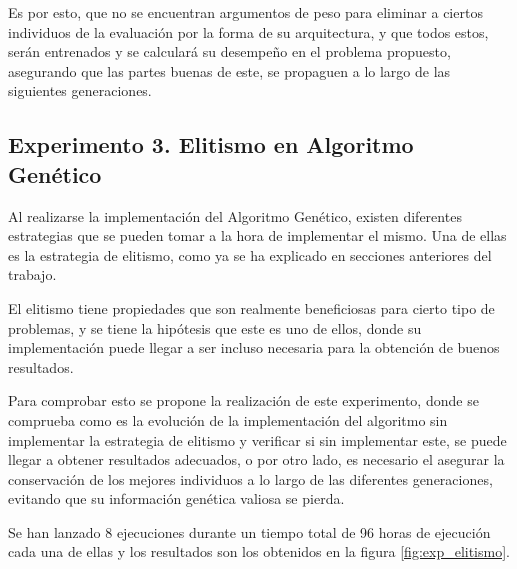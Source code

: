 Es por esto, que no se encuentran argumentos de peso para eliminar a ciertos individuos de la evaluación por la forma de su arquitectura, y que todos estos, serán entrenados y se calculará su desempeño en el problema propuesto, asegurando que las partes buenas de este, se propaguen a lo largo de las siguientes generaciones.

\subsection{Experimento 3. Elitismo en Algoritmo Genético}

Al realizarse la implementación del Algoritmo Genético, existen diferentes estrategias que se pueden tomar a la hora de implementar el mismo. Una de ellas es la estrategia de elitismo, como ya se ha explicado en secciones anteriores del trabajo.

El elitismo tiene propiedades que son realmente beneficiosas para cierto tipo de problemas, y se tiene la hipótesis que este es uno de ellos, donde su implementación puede llegar a ser incluso necesaria para la obtención de buenos resultados.

Para comprobar esto se propone la realización de este experimento, donde se comprueba como es la evolución de la implementación del algoritmo sin implementar la estrategia de elitismo y verificar si sin implementar este, se puede llegar a obtener resultados adecuados, o por otro lado, es necesario el asegurar la conservación de los mejores individuos a lo largo de las diferentes generaciones, evitando que su información genética valiosa se pierda.

Se han lanzado 8 ejecuciones durante un tiempo total de 96 horas de ejecución cada una de ellas y los resultados son los obtenidos en la figura \ref{fig:exp_elitismo}.

